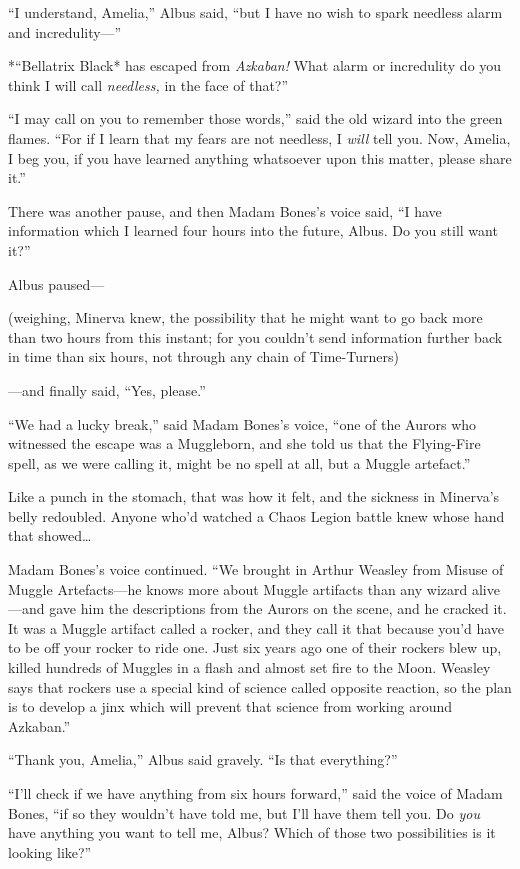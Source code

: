 ``I understand, Amelia,'' Albus said, ``but I have no wish to spark
needless alarm and incredulity---''

*``Bellatrix Black* has escaped from \emph{Azkaban!} What alarm or
incredulity do you think I will call \emph{needless,} in the face of
that?''

``I may call on you to remember those words,'' said the old wizard into
the green flames. ``For if I learn that my fears are not needless, I
\emph{will} tell you. Now, Amelia, I beg you, if you have learned
anything whatsoever upon this matter, please share it.''

There was another pause, and then Madam Bones's voice said, ``I have
information which I learned four hours into the future, Albus. Do you
still want it?''

Albus paused---

(weighing, Minerva knew, the possibility that he might want to go back
more than two hours from this instant; for you couldn't send information
further back in time than six hours, not through any chain of
Time-Turners)

---and finally said, ``Yes, please.''

``We had a lucky break,'' said Madam Bones's voice, ``one of the Aurors
who witnessed the escape was a Muggleborn, and she told us that the
Flying-Fire spell, as we were calling it, might be no spell at all, but
a Muggle artefact.''

Like a punch in the stomach, that was how it felt, and the sickness in
Minerva's belly redoubled. Anyone who'd watched a Chaos Legion battle
knew whose hand that showed\ldots{}

Madam Bones's voice continued. ``We brought in Arthur Weasley from
Misuse of Muggle Artefacts---he knows more about Muggle artifacts than
any wizard alive---and gave him the descriptions from the Aurors on the
scene, and he cracked it. It was a Muggle artifact called a rocker, and
they call it that because you'd have to be off your rocker to ride one.
Just six years ago one of their rockers blew up, killed hundreds of
Muggles in a flash and almost set fire to the Moon. Weasley says that
rockers use a special kind of science called opposite reaction, so the
plan is to develop a jinx which will prevent that science from working
around Azkaban.''

``Thank you, Amelia,'' Albus said gravely. ``Is that everything?''

``I'll check if we have anything from six hours forward,'' said the
voice of Madam Bones, ``if so they wouldn't have told me, but I'll have
them tell you. Do \emph{you} have anything you want to tell me, Albus?
Which of those two possibilities is it looking like?''

